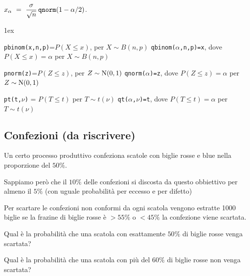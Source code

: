 \documentclass[11pt,openany]{book}
\begin{document}
\hfill $x_\alpha\ =\ \dfrac{\sigma}{\sqrt n}\,{\tt qnorm}(1-\alpha/2)$.


\vfill
\parskip1ex
{\hrulefill\scriptsize

{\tt pbinom(x,n,p)}=$P(X\le x)$, per $X\sim B(n,p)$
\hfill 
{\tt qbinom($\alpha$,n,p)=x},  dove $P(X\le x)=\alpha$ per $X\sim B(n,p)$

{\tt pnorm(z)}=$P(Z\le z)$, per $Z\sim {\rm N}(0,1)$
\hfill 
{\tt qnorm($\alpha$)=z},  dove $P(Z\le z)=\alpha$ per $Z\sim {\rm N}(0,1)$

{\tt pt(t,$\nu$)} = $P(T\le t)$ per $T\sim t(\nu)$
\hfill
{\tt qt($\alpha$,$\nu$)=t}, dove $P(T\le t)=\alpha$ per $T\sim t(\nu)$

}


\clearpage\subsection{Confezioni (da riscrivere)}

Un certo processo produttivo confeziona scatole con biglie rosse e blue nella proporzione del $50\%$.

Sappiamo però che il $10\%$ delle confezioni si discosta da questo obbiettivo per almeno il $5\%$
 (con uguale probabilità per eccesso e per difetto)

Per scartare le confezioni non conformi da ogni scatola vengono estratte 1000 biglie se la frazine di biglie rosse è $>55\%$ o $<45\%$ la confezione viene scartata.

Qual è la probabilità che una scatola con esattamente $50\%$ di biglie rosse venga scartata?

Qual è la probabilità che una scatola con più del $60\%$ di biglie rosse non venga scartata?
\end{document}
